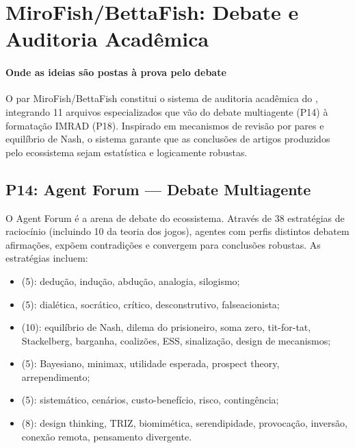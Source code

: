 \section{MiroFish/BettaFish: Debate e Auditoria Acadêmica}
\label{sec:mirofish-bettafish}
\nivelphd

\paragraph{Onde as ideias são postas à prova pelo debate} O par MiroFish/BettaFish constitui o sistema de auditoria acadêmica
do \opencodeeco{}, integrando 11 arquivos especializados que vão do
debate multiagente (P14) à formatação IMRAD (P18). Inspirado em
mecanismos de revisão por pares e equilíbrio de Nash, o sistema
garante que as conclusões de artigos produzidos pelo ecossistema
sejam estatística e logicamente robustas.

\subsection{P14: Agent Forum — Debate Multiagente}

O Agent Forum é a arena de debate do ecossistema. Através de 38
estratégias de raciocínio (incluindo 10 da teoria dos jogos), agentes
com perfis distintos debatem afirmações, expõem contradições e
convergem para conclusões robustas. As estratégias incluem:

\begin{itemize}
\item {} (5): dedução, indução, abdução,
analogia, silogismo;
\item {} (5): dialética, socrático,
crítico, desconstrutivo, falseacionista;
\item {} (10): equilíbrio de Nash, dilema
do prisioneiro, soma zero, tit-for-tat, Stackelberg, barganha,
coalizões, ESS, sinalização, design de mecanismos;
\item {} (5): Bayesiano, minimax,
utilidade esperada, prospect theory, arrependimento;
\item {} (5): sistemático, cenários, custo-benefício,
risco, contingência;
\item {} (8): design thinking, TRIZ, biomimética,
serendipidade, provocação, inversão, conexão remota, pensamento
divergente.
\end{itemize}

